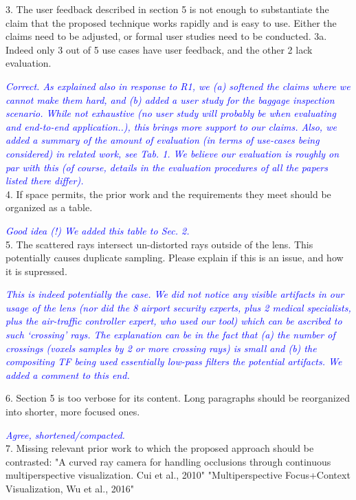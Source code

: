 \documentclass[a4paper,10pt]{article}
\newcommand{\rr}[1]{\emph{\textcolor{blue}{#1}}}
\begin{document}
    3. The user feedback described in section 5 is not enough to substantiate the
    claim that the proposed technique works rapidly and is easy to use. Either the
    claims need to be adjusted, or formal user studies need to be conducted.
    3a. Indeed only 3 out of 5 use cases have user feedback, and the other 2 lack
    evaluation.
    
    \rr{Correct. As explained also in response to R1, we (a) softened the claims where we cannot make them hard, and (b) added a user study for the baggage inspection scenario. While not exhaustive (no user study will probably be when evaluating and end-to-end application..), this brings more support to our claims. Also, we added a summary of the amount of evaluation (in terms of use-cases being considered) in related work, see Tab. 1. We believe our evaluation is roughly on par with this (of course, details in the evaluation procedures of all the papers listed there differ).}\\
    
    
    4. If space permits, the prior work and the requirements they meet should be
    organized as a table.
    
    \rr{Good idea (!) We added this table to Sec. 2.}\\
    
    5. The scattered rays intersect un-distorted rays outside of the lens. This
    potentially causes duplicate sampling. Please explain if this is an issue, and how
    it is supressed.
    
    \rr{This is indeed potentially the case. We did not notice any visible artifacts in our usage of the lens (nor did the 8 airport security experts, plus 2 medical specialists, plus the air-traffic controller expert, who used our tool) which can be ascribed to such `crossing' rays. The explanation can be in the fact that (a) the number of crossings (voxels samples by 2 or more crossing rays) is small and (b) the compositing TF being used essentially low-pass filters the potential artifacts. We added a comment to this end.}
    
    6. Section 5 is too verbose for its content. Long paragraphs should be reorganized
    into shorter, more focused ones.
    
    \rr{Agree, shortened/compacted.}\\
    
    7. Missing relevant prior work to which the proposed approach should be
    contrasted:
    "A curved ray camera for handling occlusions through continuous multiperspective
    visualization. Cui et al., 2010"
    "Multiperspective Focus+Context Visualization, Wu et al., 2016"
\end{document}
